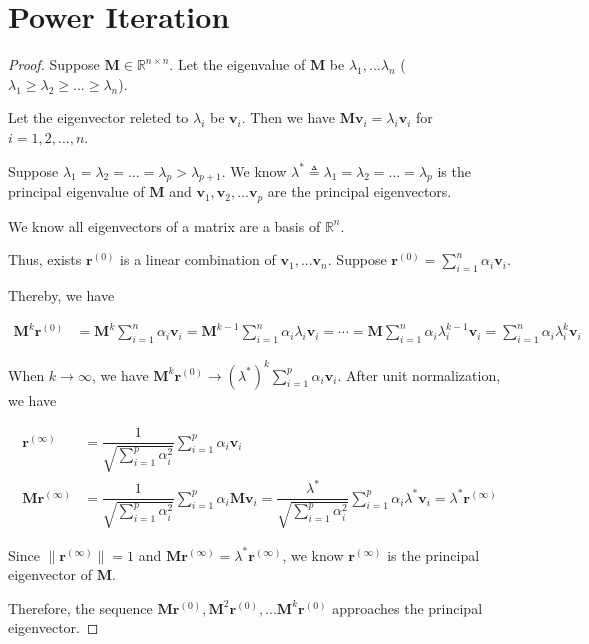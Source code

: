 \documentclass{article}
\newcommand{\bd}[1]{\boldsymbol{#1}}
\begin{document}
\section{Power Iteration}
\vspace{1em}
\begin{proof}
    Suppose $\bd{M}\in\mathbb{R}^{n\times n}$. Let the eigenvalue of $\bd{M}$ be $\lambda_1,...\lambda_n$ ($\lambda_1\geq\lambda_2\geq...\geq\lambda_n$). 
    
    \hspace{1.3em}
    Let the eigenvector releted to $\lambda_i$ be $\bd{v}_i$.
    Then we have $\bd{M}\bd{v}_i = \lambda_i\bd{v}_i$ for $i=1,2,...,n$.

    \hspace{1.3em}
    Suppose $\lambda_1=\lambda_2=...=\lambda_p>\lambda_{p+1}$. We know $\lambda^*\triangleq\lambda_1=\lambda_2=...=\lambda_p$ is the principal eigenvalue of $\bd{M}$ and $\bd{v}_1, \bd{v}_2,...\bd{v}_p$ are the principal eigenvectors.

    \hspace{1.3em}
    We know all eigenvectors of a matrix are a basis of $\mathbb{R}^{n}$. 
    
    \hspace{1.3em}
    Thus, exists $\bd{r}^{(0)}$ is a linear combination of $\bd{v}_1,...\bd{v}_n.$
    Suppose $\bd{r}^{(0)}=\sum_{i=1}^n \alpha_i \bd{v}_i.$

    \hspace{1.3em}
    Thereby, we have

    \vspace{-1.5em}
    \begin{align*}
        \bd{M}^k\bd{r}^{(0)} &= \bd{M}^k\sum_{i=1}^n \alpha_i \bd{v}_i = \bd{M}^{k-1}\sum_{i=1}^n \alpha_i\lambda_i\bd{v}_i = \cdots = \bd{M}\sum_{i=1}^n \alpha_i \lambda_i^{k-1}\bd{v}_i = \sum_{i=1}^n \alpha_i\lambda_i^k\bd{v}_i 
    \end{align*}

    \hspace{1.3em}
    When $k\to\infty$, we have $\bd{M}^k\bd{r}^{(0)} \to (\lambda^*)^k\sum_{i=1}^p\alpha_i\bd{v}_i$. After unit normalization, we have 
    
    \vspace{-1.5em}
    \begin{align*}
        \bd{r}^{(\infty)}&=\dfrac{1}{\sqrt{\sum_{i=1}^p\alpha_i^2}}\sum_{i=1}^p\alpha_i\bd{v}_i \\
        \bd{M}\bd{r}^{(\infty)}&=\dfrac{1}{\sqrt{\sum_{i=1}^p\alpha_i^2}}\sum_{i=1}^p\alpha_i\bd{M}\bd{v}_i = \dfrac{\lambda^*}{\sqrt{\sum_{i=1}^p\alpha_i^2}}\sum_{i=1}^p\alpha_i\lambda^*\bd{v}_i = \lambda^*\bd{r}^{(\infty)}
    \end{align*}

    \hspace{1.3em}
    Since $\|\bd{r}^{(\infty)}\|=1$ and $\bd{M}\bd{r}^{(\infty)}=\lambda^*\bd{r}^{(\infty)}$, we know $\bd{r}^{(\infty)}$ is the principal eigenvector of $\bd{M}$.

    \hspace{1.3em}
    Therefore, the sequence $\bd{M}\bd{r}^{(0)}, \bd{M}^2\bd{r}^{(0)}, ... \bd{M}^k\bd{r}^{(0)}$ approaches the principal eigenvector.
\end{proof}
\end{document}
